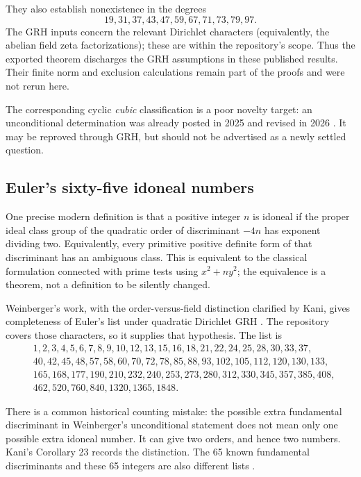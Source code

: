 \documentclass[11pt,letterpaper]{article}
\theoremstyle{definition}
\theoremstyle{remark}
\begin{document}
They also establish nonexistence in the degrees
\[
 19,31,37,43,47,59,67,71,73,79,97.
\]
The GRH inputs concern the relevant Dirichlet characters (equivalently,
the abelian field zeta factorizations); these are within the repository's
scope. Thus the exported theorem discharges the GRH assumptions in these
published results. Their finite norm and exclusion calculations remain
part of the proofs and were not rerun here.

The corresponding cyclic \emph{cubic} classification is a poor novelty
target: an unconditional determination was already posted in 2025 and
revised in 2026 \cite{cyclic-cubic}. It may be reproved through GRH, but
should not be advertised as a newly settled question.

\subsection{Euler's sixty-five idoneal numbers}

One precise modern definition is that a positive integer \(n\) is
idoneal if the proper ideal class group of the quadratic order of
discriminant \(-4n\) has exponent dividing two. Equivalently, every
primitive positive definite form of that discriminant has an ambiguous
class. This is equivalent to the classical formulation connected with
prime tests using \(x^2+ny^2\); the equivalence is a theorem, not a
definition to be silently changed.

Weinberger's work, with the order-versus-field distinction clarified by
Kani, gives completeness of Euler's list under quadratic Dirichlet GRH
\cite{weinberger,kani,watkins}. The repository covers those characters,
so it supplies that hypothesis. The list is
\begin{align*}
&1,2,3,4,5,6,7,8,9,10,12,13,15,16,18,21,22,24,25,28,30,33,37,\\
&40,42,45,48,57,58,60,70,72,78,85,88,93,102,105,112,120,130,133,\\
&165,168,177,190,210,232,240,253,273,280,312,330,345,357,385,408,\\
&462,520,760,840,1320,1365,1848.
\end{align*}

There is a common historical counting mistake: the possible extra
fundamental discriminant in Weinberger's unconditional statement does
not mean only one possible extra idoneal number. It can give two orders,
and hence two numbers. Kani's Corollary 23 records the distinction.
The 65 known fundamental discriminants and these 65 integers are also
different lists \cite{kani,watkins}.
\end{document}
